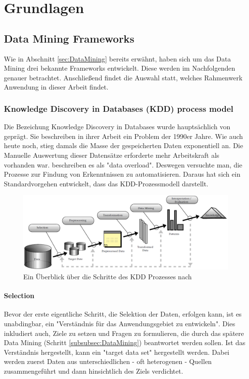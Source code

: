 \chapter{Grundlagen}

\section{Data Mining Frameworks}
Wie in Abschnitt \ref{sec:DataMining} bereits erwähnt, haben sich um das Data Mining drei bekannte Frameworks entwickelt. Diese werden im Nachfolgenden genauer betrachtet. Anschließend findet die Auswahl statt, welches Rahmenwerk Anwendung in dieser Arbeit findet.

\subsection{Knowledge Discovery in Databases (KDD) process model}
Die Bezeichung Knowledge Discovery in Databases wurde hauptsächlich von \citep{fayyad_data_1996} geprägt. Sie beschreiben in ihrer Arbeit ein Problem der 1990er Jahre. Wie auch heute noch, stieg damals die Masse der gespeicherten Daten exponentiell  an. Die Manuelle Auswertung dieser Datensätze erforderte mehr Arbeitskraft als vorhanden war. \citep[S.~38]{fayyad_data_1996} beschreiben es als "data overload". Deswegen versuchte man, die Prozesse zur Findung von Erkenntnissen zu automatisieren. Daraus hat sich ein Standardvorgehen entwickelt, dass das KDD-Prozessmodell darstellt.
\begin{figure}[h]
\includegraphics[width=\textwidth]{images/kddprocess}
\caption{Ein Überblick über die Schritte des KDD Prozesses nach \citep[S.~41]{fayyad_data_1996}}
\label{fig:kddprocess}
\centering
\end{figure}


\subsubsection{Selection}
Bevor der erste eigentliche Schritt, die Selektion der Daten, erfolgen kann, ist es unabdingbar, ein "Verständnis für das Anwendungsgebiet zu entwickeln".\citep[S.~42; eigene Übersetzung]{fayyad_data_1996} Dies inkludiert auch, Ziele zu setzen und Fragen zu formulieren, die durch das spätere Data Mining (Schritt \ref{subsubsec:DataMining}) beantwortet werden sollen.  Ist das Verständnis hergestellt, kann ein "target data set"\citep[S.~42]{fayyad_data_1996} hergestellt werden. Dabei werden zuerst Daten aus unterschiedlichen - oft heterogenen - Quellen zusammengeführt und dann hinsichtlich des Ziels verdichtet.\citep[S.~70]{swamynathan_mastering_2017}

